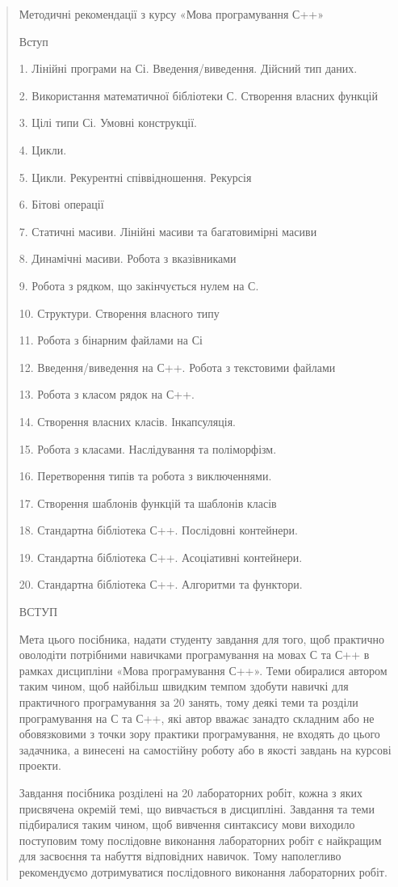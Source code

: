 \documentclass[]{article}
\date{}
\begin{document}
\begin{quote}
Методичні рекомендації з курсу «Мова програмування С++»

Вступ

1. Лінійні програми на Сі. Введення/виведення. Дійсний тип даних.

2. Використання математичної бібліотеки С. Створення власних функцій

3. Цілі типи Сі. Умовні конструкції.

4. Цикли.

5. Цикли. Рекурентні співвідношення. Рекурсія

6. Бітові операції

7. Статичні масиви. Лінійні масиви та багатовимірні масиви

8. Динамічні масиви. Робота з вказівниками

9. Робота з рядком, що закінчується нулем на С.

10. Структури. Створення власного типу

11. Робота з бінарним файлами на Сі

12. Введення/виведення на С++. Робота з текстовими файлами

13. Робота з класом рядок на С++.

14. Створення власних класів. Інкапсуляція.

15. Робота з класами. Наслідування та поліморфізм.

16. Перетворення типів та робота з виключеннями.

17. Створення шаблонів функцій та шаблонів класів

18. Стандартна бібліотека С++. Послідовні контейнери.

19. Стандартна бібліотека С++. Асоціативні контейнери.

20. Стандартна бібліотека С++. Алгоритми та функтори.

ВСТУП

Мета цього посібника, надати студенту завдання для того, щоб практично
оволодіти потрібними навичками програмування на мовах С та С++ в рамках
дисципліни «Мова програмування С++». Теми обиралися автором таким чином,
щоб найбільш швидким темпом здобути навичкі для практичного
програмування за 20 занять, тому деякі теми та розділи програмування на
С та С++, які автор вважає занадто складним або не обовязковими з точки
зору практики програмування, не входять до цього задачника, а винесені
на самостійну роботу або в якості завдань на курсові проекти.

Завдання посібника розділені на 20 лабораторних робіт, кожна з яких
присвячена окремій темі, що вивчається в дисципліні. Завдання та теми
підбиралися таким чином, щоб вивчення синтаксису мови виходило
поступовим тому послідовне виконання лабораторних робіт є найкращим для
засвоєння та набуття відповідних навичок. Тому наполегливо рекомендуємо
дотримуватися послідовного виконання лабораторних робіт.


\end{quote}
\end{document}
